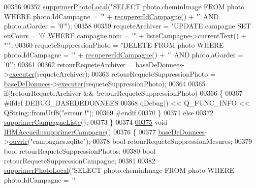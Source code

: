 \begin{DoxyCode}
{00356 
00357     \hyperlink{class_i_h_m_accueil_a9dc22241cd0d4a227b8b0bf04c6404fd}{supprimerPhotoLocal}(\textcolor{stringliteral}{"SELECT photo.cheminImage FROM photo WHERE photo.IdCampagne = '"}
       + \hyperlink{class_i_h_m_accueil_a5e222617897b2c1f7e032fa851aa1700}{recupererIdCampagne}() + \textcolor{stringliteral}{"' AND photo.aGarder = '0'"});
00358 
00359     requeteArchiver = \textcolor{stringliteral}{"UPDATE campagne SET enCours = '0' WHERE campagne.nom = '"} + 
      \hyperlink{class_i_h_m_accueil_afb828a4e06c25afa40341c310cd85b08}{listeCampagne}->currentText() + \textcolor{stringliteral}{"'"};
00360     requeteSuppressionPhoto = \textcolor{stringliteral}{"DELETE FROM photo WHERE photo.IdCampagne = '"} + 
      \hyperlink{class_i_h_m_accueil_a5e222617897b2c1f7e032fa851aa1700}{recupererIdCampagne}() + \textcolor{stringliteral}{"' AND photo.aGarder = '0'"};
00361 
00362     retourRequeteArchiver = \hyperlink{class_i_h_m_accueil_ab56d9846c071396a92f88272880e2c1f}{baseDeDonnees}->\hyperlink{class_base_de_donnees_aa8de5f8f8bb17edc43f5c0ee33712081}{executer}(requeteArchiver);
00363     retourRequeteSuppressionPhoto = \hyperlink{class_i_h_m_accueil_ab56d9846c071396a92f88272880e2c1f}{baseDeDonnees}->\hyperlink{class_base_de_donnees_aa8de5f8f8bb17edc43f5c0ee33712081}{executer}(requeteSuppressionPhoto);
00364 
00365     \textcolor{keywordflow}{if}(!retourRequeteArchiver && !retourRequeteSuppressionPhoto)
00366     \{
00367 \textcolor{preprocessor}{        #ifdef DEBUG\_BASEDEDONNEES}
00368             qDebug() << Q\_FUNC\_INFO << QString::fromUtf8(\textcolor{stringliteral}{"erreur !"});
00369 \textcolor{preprocessor}{        #endif}
00370     \}
00371     \textcolor{keywordflow}{else}
00372         \hyperlink{class_i_h_m_accueil_a36ce6ecca4e258562577bab1439e0a96}{supprimerCampagneListe}();
00373 \}
00374 
\hyperlink{class_i_h_m_accueil_a0d7c77277fe83ad13beee56d96c5c5ca}{00375} \textcolor{keywordtype}{void} \hyperlink{class_i_h_m_accueil_a0d7c77277fe83ad13beee56d96c5c5ca}{IHMAccueil::supprimerCampagne}()
00376 \{
00377     \hyperlink{class_i_h_m_accueil_ab56d9846c071396a92f88272880e2c1f}{baseDeDonnees}->\hyperlink{class_base_de_donnees_a7f6a5510b08017b0d99115a84252f186}{ouvrir}(\textcolor{stringliteral}{"campagnes.sqlite"});
00378     \textcolor{keywordtype}{bool} retourRequeteSuppressionMesures;
00379     \textcolor{keywordtype}{bool} retourRequeteSuppressionPhotos;
00380     \textcolor{keywordtype}{bool} retourRequeteSuppressionCampagne;
00381 
00382     \hyperlink{class_i_h_m_accueil_a9dc22241cd0d4a227b8b0bf04c6404fd}{supprimerPhotoLocal}(\textcolor{stringliteral}{"SELECT photo.cheminImage FROM photo WHERE photo.IdCampagne = '"}
}
\end{DoxyCode}

